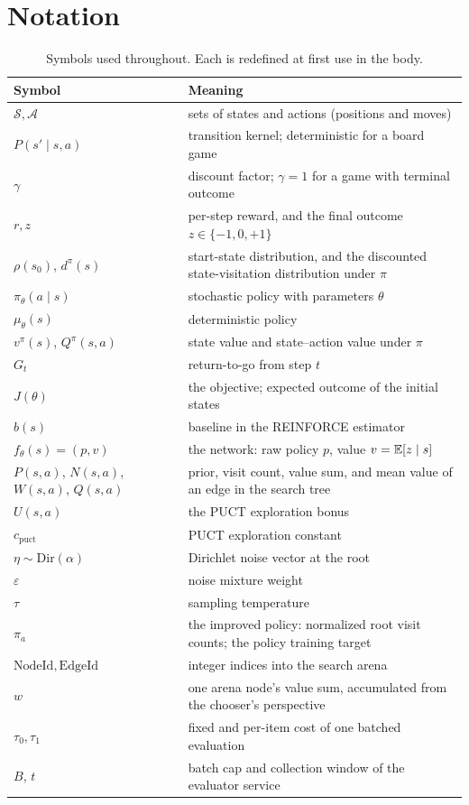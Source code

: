 \section{Notation}
\label{app:notation}

\begin{table}[h]
\centering
\small
\begin{tabularx}{\textwidth}{@{}l X@{}}
\toprule
Symbol & Meaning \\
\midrule
$\mathcal{S}, \mathcal{A}$ & sets of states and actions (positions and moves) \\
$P(s' \mid s, a)$ & transition kernel; deterministic for a board game \\
$\gamma$ & discount factor; $\gamma = 1$ for a game with terminal outcome \\
$r, z$ & per-step reward, and the final outcome $z \in \{-1,0,+1\}$ \\
$\rho(s_0)$, $d^\pi(s)$ & start-state distribution, and the discounted
state-visitation distribution under $\pi$ \\
$\pi_\theta(a \mid s)$ & stochastic policy with parameters $\theta$ \\
$\mu_\theta(s)$ & deterministic policy \\
$v^\pi(s)$, $Q^\pi(s,a)$ & state value and state--action value under $\pi$ \\
$G_t$ & return-to-go from step $t$ \\
$J(\theta)$ & the objective; expected outcome of the initial states \\
$b(s)$ & baseline in the REINFORCE estimator \\
$f_\theta(s) = (p, v)$ & the network: raw policy $p$, value $v = \mathbb{E}[z \mid s]$ \\
$P(s,a)$, $N(s,a)$, $W(s,a)$, $Q(s,a)$ & prior, visit count, value sum, and mean
value of an edge in the search tree \\
$U(s,a)$ & the PUCT exploration bonus \\
$c_{\mathrm{puct}}$ & PUCT exploration constant \\
$\eta \sim \mathrm{Dir}(\alpha)$ & Dirichlet noise vector at the root \\
$\varepsilon$ & noise mixture weight \\
$\tau$ & sampling temperature \\
$\pi_a$ & the improved policy: normalized root visit counts; the policy training
target \\
$\mathrm{NodeId}, \mathrm{EdgeId}$ & integer indices into the search arena \\
$w$ & one arena node's value sum, accumulated from the chooser's perspective \\
$\tau_0, \tau_1$ & fixed and per-item cost of one batched evaluation \\
$B$, $t$ & batch cap and collection window of the evaluator service \\
\bottomrule
\end{tabularx}
\caption{Symbols used throughout. Each is redefined at first use in the body.}
\label{tab:notation}
\end{table}

